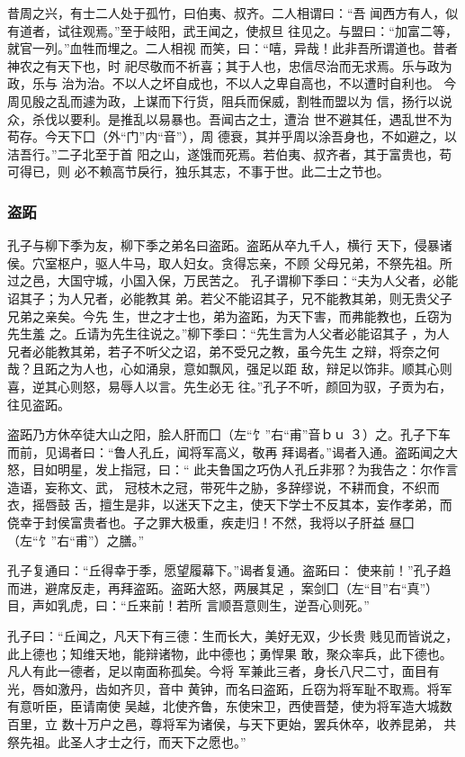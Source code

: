 \documentclass[]{article}
\begin{document}
昔周之兴，有士二人处于孤竹，曰伯夷、叔齐。二人相谓曰：``吾
闻西方有人，似有道者，试往观焉。''至于岐阳，武王闻之，使叔旦
往见之。与盟曰：``加富二等，就官一列。''血牲而埋之。二人相视
而笑，曰：``嘻，异哉！此非吾所谓道也。昔者神农之有天下也，时
祀尽敬而不祈喜；其于人也，忠信尽治而无求焉。乐与政为政，乐与
治为治。不以人之坏自成也，不以人之卑自高也，不以遭时自利也。
今周见殷之乱而遽为政，上谋而下行货，阻兵而保威，割牲而盟以为
信，扬行以说众，杀伐以要利。是推乱以易暴也。吾闻古之士，遭治
世不避其任，遇乱世不为苟存。今天下囗（外``门''内``音''），周
德衰，其并乎周以涂吾身也，不如避之，以洁吾行。''二子北至于首
阳之山，遂饿而死焉。若伯夷、叔齐者，其于富贵也，苟可得已，则
必不赖高节戾行，独乐其志，不事于世。此二士之节也。

\hypertarget{header-n970}{%
\subsubsection{盗跖}\label{header-n970}}

孔子与柳下季为友，柳下季之弟名曰盗跖。盗跖从卒九千人，横行
天下，侵暴诸侯。穴室枢户，驱人牛马，取人妇女。贪得忘亲，不顾
父母兄弟，不祭先祖。所过之邑，大国守城，小国入保，万民苦之。
孔子谓柳下季曰：``夫为人父者，必能诏其子；为人兄者，必能教其
弟。若父不能诏其子，兄不能教其弟，则无贵父子兄弟之亲矣。今先
生，世之才士也，弟为盗跖，为天下害，而弗能教也，丘窃为先生羞
之。丘请为先生往说之。''柳下季曰：``先生言为人父者必能诏其子
，为人兄者必能教其弟，若子不听父之诏，弟不受兄之教，虽今先生
之辩，将奈之何哉？且跖之为人也，心如涌泉，意如飘风，强足以距
敌，辩足以饰非。顺其心则喜，逆其心则怒，易辱人以言。先生必无
往。''孔子不听，颜回为驭，子贡为右，往见盗跖。

盗跖乃方休卒徒大山之阳，脍人肝而囗（左``饣''右``甫''音ｂｕ
３）之。孔子下车而前，见谒者曰：``鲁人孔丘，闻将军高义，敬再
拜谒者。''谒者入通。盗跖闻之大怒，目如明星，发上指冠，曰：``
此夫鲁国之巧伪人孔丘非邪？为我告之：尔作言造语，妄称文、武，
冠枝木之冠，带死牛之胁，多辞缪说，不耕而食，不织而衣，摇唇鼓
舌，擅生是非，以迷天下之主，使天下学士不反其本，妄作孝弟，而
侥幸于封侯富贵者也。子之罪大极重，疾走归！不然，我将以子肝益
昼囗（左``饣''右``甫''）之膳。''

孔子复通曰：``丘得幸于季，愿望履幕下。''谒者复通。盗跖曰：
使来前！''孔子趋而进，避席反走，再拜盗跖。盗跖大怒，两展其足
，案剑囗（左``目''右``真''）目，声如乳虎，曰：``丘来前！若所
言顺吾意则生，逆吾心则死。''

孔子曰：``丘闻之，凡天下有三德：生而长大，美好无双，少长贵
贱见而皆说之，此上德也；知维天地，能辩诸物，此中德也；勇悍果
敢，聚众率兵，此下德也。凡人有此一德者，足以南面称孤矣。今将
军兼此三者，身长八尺二寸，面目有光，唇如激丹，齿如齐贝，音中
黄钟，而名曰盗跖，丘窃为将军耻不取焉。将军有意听臣，臣请南使
吴越，北使齐鲁，东使宋卫，西使晋楚，使为将军造大城数百里，立
数十万户之邑，尊将军为诸侯，与天下更始，罢兵休卒，收养昆弟，
共祭先祖。此圣人才士之行，而天下之愿也。''
\end{document}
